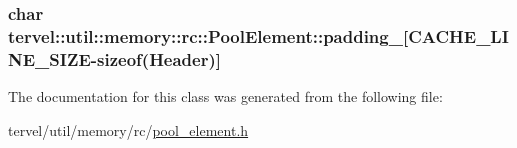 \subsubsection[{padding\+\_\+}]{\setlength{\rightskip}{0pt plus 5cm}char tervel\+::util\+::memory\+::rc\+::\+Pool\+Element\+::padding\+\_\+\mbox{[}{\bf C\+A\+C\+H\+E\+\_\+\+L\+I\+N\+E\+\_\+\+S\+I\+Z\+E}-\/sizeof({\bf Header})\mbox{]}\hspace{0.3cm}{\ttfamily [private]}}\label{classtervel_1_1util_1_1memory_1_1rc_1_1_pool_element_ab97d48ce3cb545bcb970e602f9ddaaa4}


The documentation for this class was generated from the following file\+:\begin{DoxyCompactItemize}
\item 
tervel/util/memory/rc/\hyperlink{pool__element_8h}{pool\+\_\+element.\+h}\end{DoxyCompactItemize}
